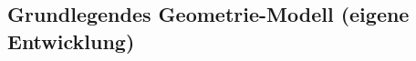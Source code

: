 \documentclass[../main/thesis.tex]{subfiles}
\begin{document}
\subsection{Grundlegendes Geometrie-Modell (eigene Entwicklung)}


\end{document}
